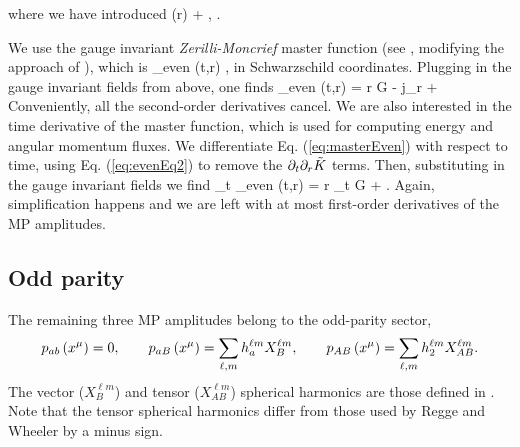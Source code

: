 \documentclass{article}
\begin{document}
where we have introduced
\be
\La(r) \equiv \la + ,
\q \q
\la \equiv {}. 
\ee 

We use the gauge invariant \emph{Zerilli-Moncrief} master function
(see \cite{Moncrief_1974,CPM_1979}, modifying the approach of 
\cite{Zerilli_1970}), which is 
\be
\label{eq:masterEven}
\Psi_{\rm even} (t,r)
\equiv {}
,
\ee
in Schwarzschild coordinates.
Plugging in the gauge invariant fields from above, one finds
\be
\Psi_{\rm even} (t,r)
= r G -  j_{r} 
+
\ee
Conveniently, all the second-order derivatives cancel.  
We are also interested in the time derivative of the master function,
which is used for computing energy and angular momentum fluxes.
We differentiate Eq. (\ref{eq:masterEven}) with respect to time, using 
Eq. (\ref{eq:evenEq2}) to remove the $\partial_{t} \partial_{r} \tilde K$ terms.
Then, substituting in the gauge invariant fields we find
\be
\pa_{t} \Psi_{\rm even} (t,r)
= r \pa_{t} G 
+
 .
\ee
Again, simplification happens and
we are left with at most first-order derivatives of the MP amplitudes.




\subsection{Odd parity}
The remaining three MP amplitudes belong to the odd-parity sector,
\begin{align}
\label{eq:MPOdd}
p_{ab} \left( x^{\mu} \right) = 0, 
\quad \quad 
p_{aB} \left( x^{\mu} \right)  = \sum_{\ell, m} h_a^{\ell m} X_B^{\ell m},  
\quad \quad
p_{AB} \left( x^{\mu} \right)  = \sum_{\ell, m} h_2^{\ell m} X^{\ell m}_{AB} .
\end{align}
The vector ($X_B^{\ell m}$) and tensor ($X_{AB}^{\ell m}$) spherical 
harmonics are those defined in \cite{MP_2005}.  Note that the tensor 
spherical harmonics differ from those used by Regge and Wheeler by a minus 
sign.  
\end{document}
